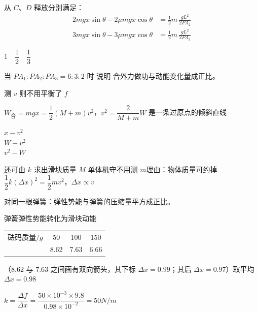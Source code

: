 从 $C$、$D$ 释放分别满足：
\begin{align*}
2mgx\sin\theta-2\mu mgx\cos\theta&=\frac12m\,\frac{gL^2}{2PA_2}\\
3mgx\sin\theta-3\mu mgx\cos\theta&=\frac12m\,\frac{gL^2}{2PA_3}
\end{align*}

$1\quad\dfrac12\quad\dfrac13$

当 $PA_1:PA_2:PA_3=6:3:2$ 时 说明 合外力做功与动能变化量成正比。

测 $v$ 则不用平衡了 $f$

$W_{\text{合}}=mgx=\dfrac12(M+m)v^2$，\quad $v^2=\dfrac{2}{M+m}W$ 是一条过原点的倾斜直线

$x-v^2$ \\
$W-v^2$ \\
$v^2-W$

还可由 $k$ 求出滑块质量 $M$
单体机守不用测 $m$\quad 理由：物体质量可约掉
$\dfrac12k(\Delta x)^2=\dfrac12mv^2$，\quad $\Delta x\propto v$


\begin{keybox}
对同一根弹簧：弹性势能与弹簧的压缩量平方成正比。
\end{keybox}

弹簧弹性势能转化为滑块动能

\begin{center}
\begin{tabular}{@{}lccc@{}}
砝码质量$/\unit{g}$ & 50 & 100 & 150 \\
 & 8.62 & 7.63 & 6.66 \\
\end{tabular}
\end{center}
（8.62 与 7.63 之间画有双向箭头，其下标 $\Delta x=0.99$；其后 $\Delta x=0.97$）\quad 取平均 $\Delta x=0.98$

$k=\dfrac{\Delta f}{\Delta x}=\dfrac{50\times10^{-3}\times9.8}{0.98\times10^{-2}}=50\unit{N/m}$%

